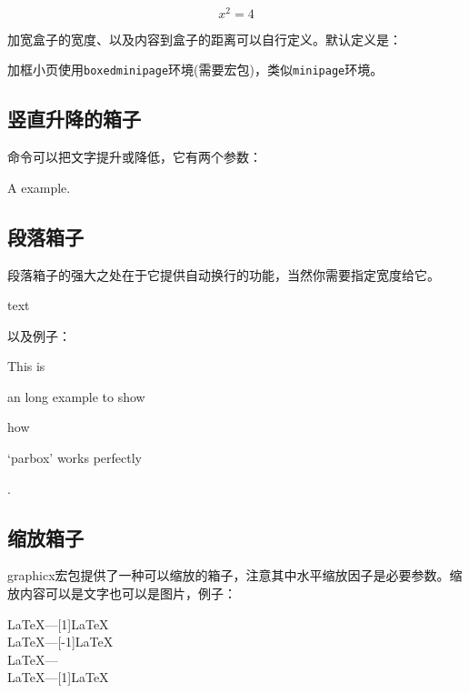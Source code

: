 \begin{codeshow}
 \\
\begin{equation}\boxed{x^2=4}
\end{equation}
\end{codeshow}

加宽盒子的宽度、以及内容到盒子的距离可以自行定义。默认定义是：
\begin{latex}{}
\setlength{\fboxrule}{0.4pt} \setlength{\fboxsep}{3pt}
\end{latex}

加框小页使用\texttt{boxedminipage}环境(需要宏包)，类似\texttt{minipage}环境。

\subsection{竖直升降的箱子}
命令\latexline{\\raisebox}可以把文字提升或降低，它有两个参数：

\begin{codeshow}
A\raisebox{-0.5ex}{n} example.
\end{codeshow}

\subsection{段落箱子}
段落箱子的强大之处在于它提供自动换行的功能，当然你需要指定宽度给它。
\begin{latex}{}
\parbox[pos]{width}{text}
\end{latex}

以及例子：

\begin{codeshow}
This is \parbox[t]{3.5em}{an long
example to show} how \parbox[b]
{4em}{`parbox' works perfectly}.
\end{codeshow}

\subsection{缩放箱子}
graphicx宏包提供了一种可以缩放的箱子\latexline{\scalebox{h-sc}[v-sc]{pbj}}，注意其中水平缩放因子是必要参数。缩放内容可以是文字也可以是图片，例子：

\begin{codeshow}
\LaTeX---\scalebox{-1}[1]{\LaTeX}\\
\LaTeX---\scalebox{1}[-1]{\LaTeX}\\
\LaTeX---\scalebox{-1}{\LaTeX}\\
\LaTeX---\scalebox{2}[1]{\LaTeX}
\end{codeshow}

